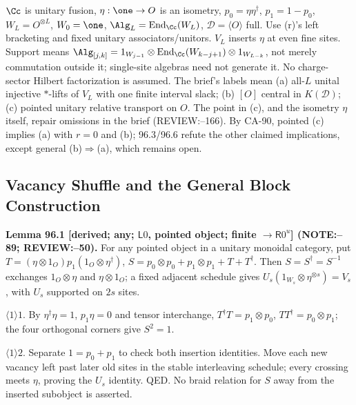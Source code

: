 \(\Cc\) is unitary fusion, \(\eta:\one\to O\) is an isometry, \(p_0=\eta\eta^\dagger\), \(p_1=1-p_0\),
\(W_L=O^{\otimes L}\), \(W_0=\one\), \(\Alg_L=\operatorname{End}_\Cc(W_L)\), \(\mathcal D=\langle O\rangle\) full.
Use (r)'s left bracketing and fixed unitary associators/unitors. \(V_L\) inserts \(\eta\) at even fine sites.
Support means \(\Alg_{[j,k]}=1_{W_{j-1}}\otimes\operatorname{End}_\Cc(W_{k-j+1})\otimes1_{W_{L-k}}\),
not merely commutation outside it; single-site algebras need not generate it. No charge-sector Hilbert factorization is assumed.
The brief's labels mean (a) all-\(L\) unital injective \(*\)-lifts of \(V_L\) with one finite interval slack;
(b) \([O]\) central in \(K(\mathcal D)\); (c) pointed unitary relative transport on \(O\).
The point in (c), and the isometry \(\eta\) itself, repair omissions in the brief (REVIEW:--166).
By CA-90, pointed (c) implies (a) with \(r=0\) and (b); 96.3/96.6 refute the other claimed implications,
except general (b)\(\Rightarrow\)(a), which remains open.

\subsection{Vacancy Shuffle and the General Block Construction}

\textbf{Lemma 96.1 [derived; any; \(\mathsf L0\), pointed object; finite \(\to\mathsf R0^u\)] (NOTE:--89; REVIEW:--50).}
For any pointed object in a unitary monoidal category, put
\(T=(\eta\otimes1_O)p_1(1_O\otimes\eta^\dagger)\),
\(S=p_0\otimes p_0+p_1\otimes p_1+T+T^\dagger\). Then \(S=S^\dagger=S^{-1}\) exchanges
\(1_O\otimes\eta\) and \(\eta\otimes1_O\); a fixed adjacent schedule gives
\(U_s(1_{W_s}\otimes\eta^{\otimes s})=V_s\), with \(U_s\) supported on \(2s\) sites.
\par\(\langle1\rangle1\). By \(\eta^\dagger\eta=1\), \(p_1\eta=0\) and tensor interchange,
\(T^\dagger T=p_1\otimes p_0\), \(TT^\dagger=p_0\otimes p_1\); the four orthogonal corners give \(S^2=1\).
\par\(\langle1\rangle2\). Separate \(1=p_0+p_1\) to check both insertion identities. Move each new vacancy left
past later old sites in the stable interleaving schedule; every crossing meets \(\eta\), proving the \(U_s\) identity.
QED. No braid relation for \(S\) away from the inserted subobject is asserted.

